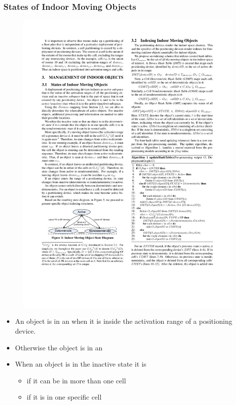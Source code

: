 \begin{frame}
\frametitle{States of Indoor Moving Objects~\cite{DBLP:conf/cikm/YangLJ09}}


  \begin{figure}[tb]
    \includegraphics[width=0.6\columnwidth]{figures/2-2/2-2-3.pdf}
  \end{figure}
  \vspace{-10pt}
  \begin{itemize}
    \item An object is in an  when it is inside the activation range of a positioning device.
    \item Otherwise the object is in an 
    \item When an object is in the inactive state it is
      \begin{itemize}
        \item {} if it can be in more than one cell
        \item {} if it is in one specific cell
      \end{itemize}
  \end{itemize}


\end{frame}

